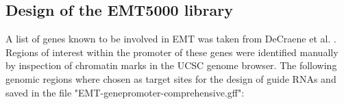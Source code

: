 \begin{footnotesize}


\section{Design of the EMT5000  library}
\label{Bioinf_methods: EMT5000 library}

A list of genes known to be involved in EMT was taken from DeCraene et al. \cite{DeCraene:2013kb}. Regions of interest within the promoter of these genes were identified manually by inspection of chromatin marks in the UCSC genome browser. The following genomic regions where chosen as target sites for the design of guide RNAs  and saved in the file "EMT-genepromoter-comprehensive.gff":

\begin{tabular}[H]{llll}


\end{tabular}
\end{footnotesize}
